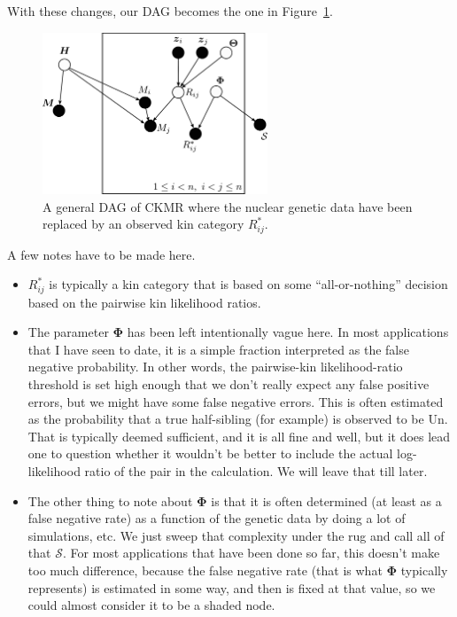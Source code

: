 \documentclass[11pt, oneside]{article}   	%
\newcommand{\Un}{\mathrm{Un}}
\newcommand{\BPhi}{\mathbf{\Phi}}
\begin{document}
With these changes, our DAG becomes the one in Figure~\ref{fig:rstar-dag}.
\begin{figure}
\begin{center}
\includegraphics[width=0.6\textwidth]{images/general-dag-3.pdf}
\end{center}
\caption{A general DAG of CKMR where the nuclear genetic data have been replaced by an observed kin category $R_{ij}^*$.}
\label{fig:rstar-dag}
\end{figure}
A few notes have to be made here. 
\begin{itemize}
\item $R^*_{ij}$ is typically a kin category that is  based on some ``all-or-nothing''
decision based on the pairwise kin likelihood ratios. 
\item The parameter $\BPhi$ has been left intentionally vague here.  In most applications that I have seen
to date, it is a simple fraction interpreted as the false negative probability.  In other words, the pairwise-kin likelihood-ratio
threshold is set high enough that we don't really expect any false positive errors, but we might have some false negative
errors.  This is often estimated as the probability that a true half-sibling (for example) is observed to be $\Un$.  That is typically
deemed sufficient, and it is all fine and well, but it does lead one to question whether it wouldn't be better to include the
actual log-likelihood ratio of the pair in the calculation.  We will leave that till later. 
\item The other thing to note about $\BPhi$ is that it is often determined (at least as a false negative rate) as a function of the
genetic data by doing a lot of simulations, etc.  We just sweep that complexity under the rug and call all of that
$\mathcal{S}$.  For most applications that have been done so far, this doesn't make too much difference, because
the false negative rate (that is what $\BPhi$ typically represents) is estimated in some way, and then is fixed at that value,
so we could almost consider it to be a shaded node.
\end{itemize}
\end{document}
